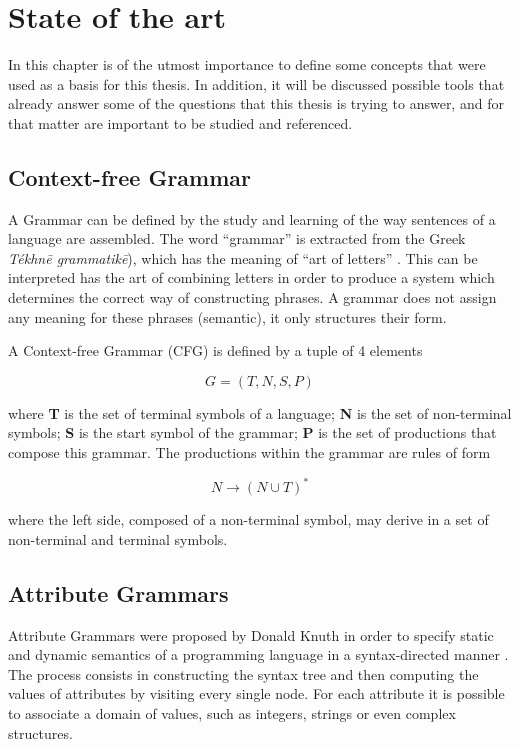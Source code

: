 \chapter{State of the art} \label{state_of_the_art}

In this chapter is of the utmost importance to define some concepts that were used as a basis for this thesis. 
In addition, it will be discussed possible tools that already answer some of the questions that this thesis is trying to answer, and for that matter are important to be studied and referenced.
	

\section{Context-free Grammar}

A Grammar can be defined by the study and learning of the way sentences of a language are assembled.
The word ``grammar'' is extracted from the Greek \emph{Tékhnē grammatikē}), which has the meaning of ``art of letters'' \cite{britannica_2020}.
This can be interpreted has the art of combining letters in order to produce a system which determines the correct way of constructing phrases.
A grammar does not assign any meaning for these phrases (semantic), it only structures their form.

A Context-free Grammar (\textsc{CFG}) is defined by a tuple of 4 elements \cite{henriques_2011}

\[ G = (T, N, S, P) \]

\noindent where \textbf{T} is the set of terminal symbols of a language;
\textbf{N} is the set of non-terminal symbols;
\textbf{S} is the start symbol of the grammar;
\textbf{P} is the set of productions that compose this grammar.
The productions within the grammar are rules of form

\[ N \rightarrow (N \cup T)^* \]

\noindent where the left side, composed of a non-terminal symbol, may derive in a set of non-terminal and terminal symbols.


\section{Attribute Grammars}
Attribute Grammars were proposed by Donald Knuth in order to specify static and dynamic semantics of a programming language in a syntax-directed manner \cite{thirunarayan_2009}. 
The process consists in constructing the syntax tree and then computing the values of attributes by visiting every single node. 
For each attribute it is possible to associate a domain of values, such as integers, strings or even complex structures. 

